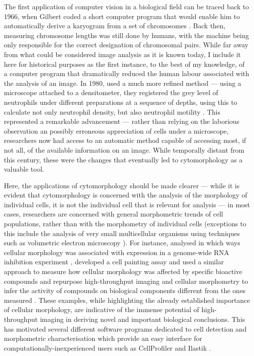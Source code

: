 The first application of computer vision in a biological field can be traced back to 1966, when Gilbert coded a short computer program that would enable him to automatically derive a karyogram from a set of chromosomes \cite{Gilbert1966-km}. Back then, measuring chromosome lengths was still done by humans, with the machine being only responsible for the correct designation of chromosomal pairs. While far away from what could be considered image analysis as it is known today, I include it here for historical purposes as the first instance, to the best of my knowledge, of a computer program that dramatically reduced the human labour associated with the analysis of an image. In 1980,  used a much more refined method --- using a microscope attached to a densitometer, they registered the grey level of neutrophils under different preparations at a sequence of depths, using this to calculate not only neutrophil density, but also neutrophil motility \cite{Howe1980-ua}. This represented a remarkable advancement --- rather than relying on the laborious observation an possibly erroneous appreciation of cells under a microscope, researchers now had access to an automatic method capable of accessing most, if not all, of the available information on an image. While temporally distant from this century, these were the changes that eventually led to cytomorphology as a valuable tool. 

Here, the applications of cytomorphology should be made clearer --- while it is evident that cytomorphology is concerned with the analysis of the morphology of individual cells, it is not the individual cell that is relevant for analysis --- in most cases, researchers are concerned with general morphometric trends of cell populations, rather than with the morphometry of individual cells (exceptions to this include the analysis of very small multicellular organisms using techniques such as volumetric electron microscopy \cite{Vergara2021-nx,Witvliet2021-gv}). For instance,  analysed in which ways cellular morphology was associated with expression in a genome-wide RNA inhibition experiment \cite{Fuchs2010-pk},  developed a cell painting assay and used a similar approach to measure how cellular morphology was affected by specific bioactive compounds \cite{Gustafsdottir2013-ul} and  repurpose high-throughput imaging and cellular morphometry to infer the activity of compounds on biological components different from the ones measured \cite{Simm2018-nh}. These examples, while highlighting the already established importance of cellular morphology, are indicative of the immense potential of high-throughput imaging in deriving novel and important biological conclusions. This has motivated several different software programs dedicated to cell detection and morphometric characterisation which provide an easy interface for computationally-inexperienced users such as CellProfiler \cite{Carpenter2006-hy} and Ilastik \cite{Sommer2011-ds}.

